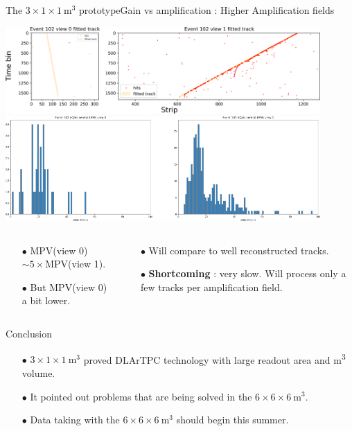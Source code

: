 \documentclass[10pt]{beamer}
\begin{document}
    \begin{frame}{The \texorpdfstring{$3 \times 1 \times \SI{1}{\meter\cubed}$}{311} prototype}{Gain vs amplification : Higher Amplification fields}
    	\begin{scriptsize}
    		\centering
    		\includegraphics[width=0.9\textwidth]{figures/311/rawdatasoft_track.png}\\
    		\includegraphics[width=0.9\textwidth]{figures/311/rawdatasoft_dQds.png}\\
    		\vfill
    		\begin{columns}
    			\begin{column}{0.5\textwidth}
    				\begin{itemize}
    					\item[$\bullet$] MPV(view 0)$\sim5\times$MPV(view 1).
    					\item[$\bullet$] But MPV(view 0) a bit lower.
    				\end{itemize}
    			\end{column}
    			\hfill
    			\begin{column}{0.5\textwidth}
    				\begin{itemize}
    					\item[$\bullet$] Will compare to well reconstructed tracks.
    					\item[$\bullet$] \textbf{Shortcoming} : very slow. Will process only a few tracks per amplification field.
    				\end{itemize}
    			\end{column}
    		\end{columns}
    	\end{scriptsize}
    \end{frame}
    
    \begin{frame}{Conclusion}
    	\begin{itemize}
    		\item[$\bullet$] $3 \times 1 \times \SI{1}{\meter\cubed}$ proved DLArTPC technology with large readout area and \si{\meter\cubed} volume.
    		\item[$\bullet$] It pointed out problems that are being solved in the $6 \times 6 \times \SI{6}{\meter\cubed}$.
    		\item[$\bullet$] Data taking with the $6 \times 6 \times \SI{6}{\meter\cubed}$ should begin this summer.
    	\end{itemize}
    \end{frame}
    
\end{document}
